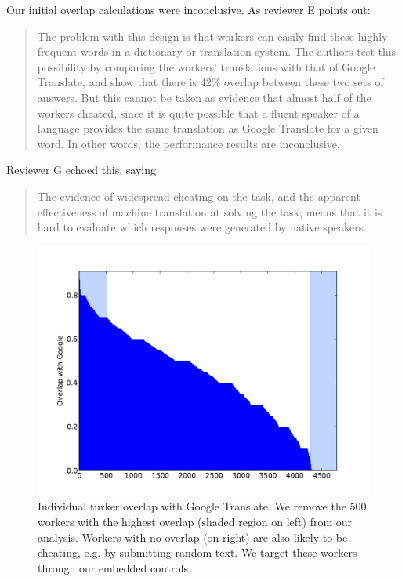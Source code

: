 \documentclass[11pt]{article}
\begin{document}
Our initial overlap calculations were inconclusive.  As reviewer E points out: 
\begin{quote}
The problem with this design is that workers can easily find
these highly frequent words in a dictionary or translation system. The
authors test this possibility by comparing the workers' translations with
that of Google Translate, and show that there is 42\% overlap between these
two sets of answers. But this cannot be taken as evidence that almost half
of the workers cheated, since it is quite possible that a fluent speaker of
a language provides the same translation as Google Translate for a given
word. In other words, the performance results are inconclusive.
\end{quote}
Reviewer G echoed this, saying
\begin{quote}
The evidence of widespread cheating on the task, and the apparent
effectiveness of machine translation at solving the task, means that it is
hard to evaluate which responses were generated by native speakers.
\end{quote}

\begin{figure}[ht]
\includegraphics[width=\linewidth]{figures/turker-googmatch-distribution.pdf}
\caption{Individual turker overlap with Google Translate. We remove the 500 workers with the highest overlap (shaded region on left) from our analysis. Workers with no overlap (on right) are also likely to be cheating, e.g. by submitting random text. We target these workers through our embedded controls.}                
\label{dist}
\end{figure}
\end{document}
